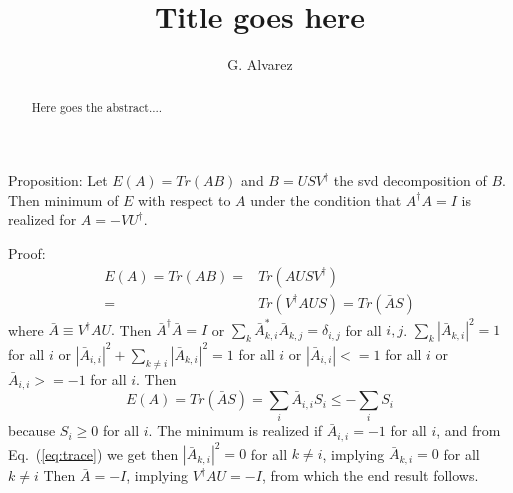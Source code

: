 \documentclass[twocolumn,showpacs,preprintnumbers,amsmath,amssymb,prb]{revtex4}
\begin{document}
\title{Title goes here}
\author{G. Alvarez}

\begin{abstract}
Here goes the abstract....
\end{abstract}

\maketitle

Proposition:
Let $E(A) = Tr(AB)$ and $B = USV^\dagger$ the svd decomposition of $B$.
Then minimum of $E$ with respect to $A$ under the condition that $A^\dagger A = I$
is realized for $A = -VU^\dagger.$


Proof: 
\begin{align}
E(A) = Tr(AB) =& Tr(AUSV^\dagger)\nonumber\\
 =& Tr(V^\dagger A U S) = Tr(\bar{A} S)
\label{eq:trace}
\end{align}
where $\bar{A} \equiv V^\dagger A U.$  Then $\bar{A}^\dagger \bar{A} = I$ or
$\sum_k \bar{A}^*_{k,i}\bar{A}_{k,j} = \delta_{i,j}$ for all $i,j$.
$\sum_k |\bar{A}_{k,i}|^2 = 1$ for all $i$ or
$|\bar{A}_{i,i}|^2 + \sum_{k\neq i} |\bar{A}_{k,i}|^2 = 1$ for all $i$ or
$|\bar{A}_{i,i}| <= 1$ for all $i$ or
$\bar{A}_{i,i} >= -1$ for all $i$.
Then 
\begin{equation}
E(A) = Tr(\bar{A} S) = \sum_i \bar{A}_{i,i} S_i \le -\sum_i S_i
\end{equation}
because $S_i \ge 0$ for all $i$.
The minimum is realized if $\bar{A}_{i,i} = -1$ for all $i$, and 
from Eq.~(\ref{eq:trace}) we get
then $|\bar{A}_{k,i}|^2 = 0$ for all $k\neq i$,
implying $\bar{A}_{k,i} = 0$ for all $k\neq i$
Then $\bar{A} = -I$, implying $V^\dagger A U = -I$, from which the end result follows.
\end{document}
